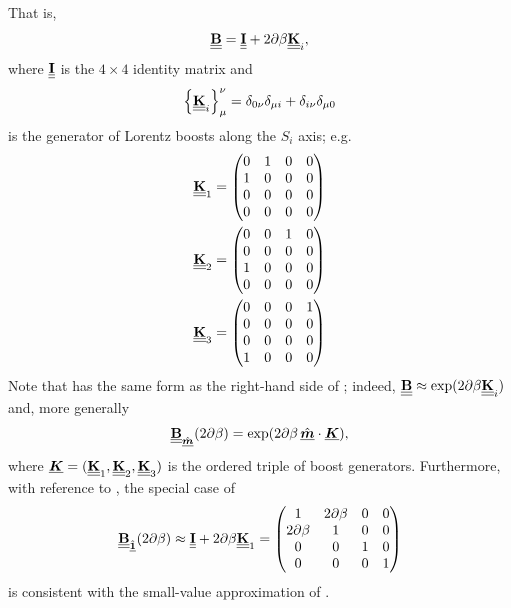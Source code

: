 %
That is,
%
\begin{equation}
    \label{eqn:small_boost_basis_Mueller}
    \underline{\underline{{\bf B}}} = \underline{\underline{{\bf I}}} + 2\partial\beta \underline{\underline{{\bf K}}}_i,
\end{equation}
where $\underline{\underline{{\bf I}}}$ is the $4\times4$ identity matrix and 
%
%
\begin{equation} \label{eqn:boost_generator_Mueller_index}
    \left\{ \underline{\underline{{\bf K}}}_i \right\}_\mu^\nu = \delta_{0\nu}\delta_{\mu i} + \delta_{i\nu} \delta_{\mu 0}
\end{equation}
%
%
is the generator of Lorentz boosts along the $S_i$ axis; e.g.
\begin{align}
\underline{\underline{{\bf K}}}_1 &= \begin{pmatrix} 0 & 1 & 0 & 0 \\ 1 & 0 & 0 & 0 \\ 0 & 0 & 0 & 0 \\ 0 & 0 & 0 & 0 \end{pmatrix}\\
\underline{\underline{{\bf K}}}_2 &= \begin{pmatrix} 0 & 0 & 1 & 0 \\ 0 & 0 & 0 & 0 \\ 1 & 0 & 0 & 0 \\ 0 & 0 & 0 & 0 \end{pmatrix}\\
\underline{\underline{{\bf K}}}_3 &= \begin{pmatrix} 0 & 0 & 0 & 1 \\ 0 & 0 & 0 & 0 \\ 0 & 0 & 0 & 0 \\ 1 & 0 & 0 & 0 \end{pmatrix}
\end{align}
%
Note that  has the same form as the right-hand side of
; indeed, $\underline{\underline{{\bf B}}} \approx \exp(2\partial\beta \underline{\underline{{\bf K}}}_i)$ and, more generally
\begin{equation}
    \label{eqn:boost_Mueller_exponential}
	\underline{\underline{{\bf B}}}_{\hat{\underline{\mbox{\scriptsize\boldmath $m$}}}}(2\partial\beta) = \exp(2\partial\beta \, {\hat{\underline{\mbox{\boldmath $m$}}}} \cdot \underline{\mbox{\boldmath $K$}}),
\end{equation}
where $\underline{\mbox{\boldmath $K$}}=(\underline{\underline{{\bf K}}}_1, \underline{\underline{{\bf K}}}_2, \underline{\underline{{\bf K}}}_3)$ is the ordered triple of boost generators.
%
Furthermore, with reference to , the special case of
\begin{equation}
    \underline{\underline{{\bf B}}}_{\hat{\underline{\mbox{\scriptsize\boldmath $1$}}}}(2\partial\beta) \approx \underline{\underline{{\bf I}}} + 2\partial\beta \underline{\underline{{\bf K}}}_1 
    = \begin{pmatrix}
    1 & 2\partial\beta & 0 & 0 \\
    2\partial\beta & 1 & 0 & 0 \\
    0 & 0 & 1 & 0 \\
    0 & 0 & 0 & 1
    \end{pmatrix}
\end{equation}
is consistent with the small-value approximation of .
%


